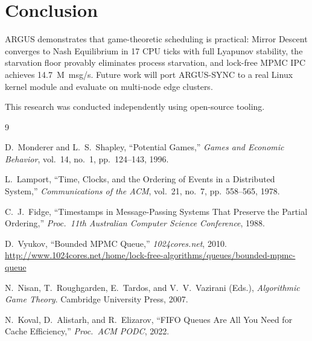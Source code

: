 \documentclass[sigconf]{acmart}
\begin{document}
\section{Conclusion}

ARGUS demonstrates that game-theoretic scheduling is practical:
Mirror Descent converges to Nash Equilibrium in 17 CPU ticks with full
Lyapunov stability, the starvation floor provably eliminates process
starvation, and lock-free MPMC IPC achieves 14.7~M~msg/s.
Future work will port ARGUS-SYNC to a real Linux kernel module and
evaluate on multi-node edge clusters.

\begin{acks}
This research was conducted independently using open-source tooling.
\end{acks}


\begin{thebibliography}{9}

D.~Monderer and L.~S.~Shapley,
``Potential Games,''
\emph{Games and Economic Behavior}, vol.~14, no.~1, pp.~124--143, 1996.

L.~Lamport,
``Time, Clocks, and the Ordering of Events in a Distributed System,''
\emph{Communications of the ACM}, vol.~21, no.~7, pp.~558--565, 1978.

C.~J.~Fidge,
``Timestamps in Message-Passing Systems That Preserve the Partial Ordering,''
\emph{Proc.\ 11th Australian Computer Science Conference}, 1988.

D.~Vyukov,
``Bounded MPMC Queue,''
\emph{1024cores.net}, 2010.
\url{http://www.1024cores.net/home/lock-free-algorithms/queues/bounded-mpmc-queue}

N.~Nisan, T.~Roughgarden, E.~Tardos, and V.~V.~Vazirani (Eds.),
\emph{Algorithmic Game Theory}.
Cambridge University Press, 2007.

N.~Koval, D.~Alistarh, and R.~Elizarov,
``FIFO Queues Are All You Need for Cache Efficiency,''
\emph{Proc.\ ACM PODC}, 2022.

\end{thebibliography}
\end{document}

